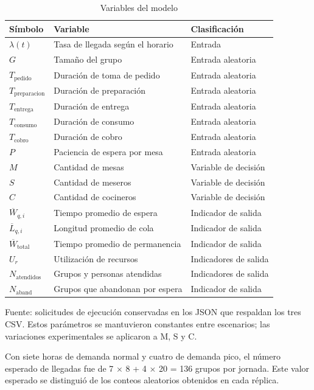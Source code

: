 \documentclass[10pt,a4paper,twocolumn]{article}
\begin{document}
\begin{table}[!tb]\centering\small
\caption{Variables del modelo}
\label{tab:2}
\setlength{\tabcolsep}{4pt}
\renewcommand{\arraystretch}{1.18}
\begin{tabularx}{\textwidth}{YYY}
\toprule
\textbf{Símbolo} & \textbf{Variable} & \textbf{Clasificación} \\
\midrule
$\lambda(t)$ & Tasa de llegada según el horario & Entrada \\
$G$ & Tamaño del grupo & Entrada aleatoria \\
$T_{\mathrm{pedido}}$ & Duración de toma de pedido & Entrada aleatoria \\
$T_{\mathrm{preparacion}}$ & Duración de preparación & Entrada aleatoria \\
$T_{\mathrm{entrega}}$ & Duración de entrega & Entrada aleatoria \\
$T_{\mathrm{consumo}}$ & Duración de consumo & Entrada aleatoria \\
$T_{\mathrm{cobro}}$ & Duración de cobro & Entrada aleatoria \\
$P$ & Paciencia de espera por mesa & Entrada aleatoria \\
$M$ & Cantidad de mesas & Variable de decisión \\
$S$ & Cantidad de meseros & Variable de decisión \\
$C$ & Cantidad de cocineros & Variable de decisión \\
$\overline W_{q,i}$ & Tiempo promedio de espera & Indicador de salida \\
$\overline L_{q,i}$ & Longitud promedio de cola & Indicador de salida \\
$\overline W_{\mathrm{total}}$ & Tiempo promedio de permanencia & Indicador de salida \\
$U_r$ & Utilización de recursos & Indicadores de salida \\
$N_{\mathrm{atendidos}}$ & Grupos y personas atendidas & Indicadores de salida \\
$N_{\mathrm{aband}}$ & Grupos que abandonan por espera & Indicador de salida \\
\bottomrule\end{tabularx}\end{table}

Fuente: solicitudes de ejecución conservadas en los JSON que respaldan los tres CSV. Estos parámetros se mantuvieron constantes entre escenarios; las variaciones experimentales se aplicaron a M, S y C.

Con siete horas de demanda normal y cuatro de demanda pico, el número esperado de llegadas fue de 7 \(\times\) 8 + 4 \(\times\) 20 = 136 grupos por jornada. Este valor esperado se distinguió de los conteos aleatorios obtenidos en cada réplica.
\end{document}
